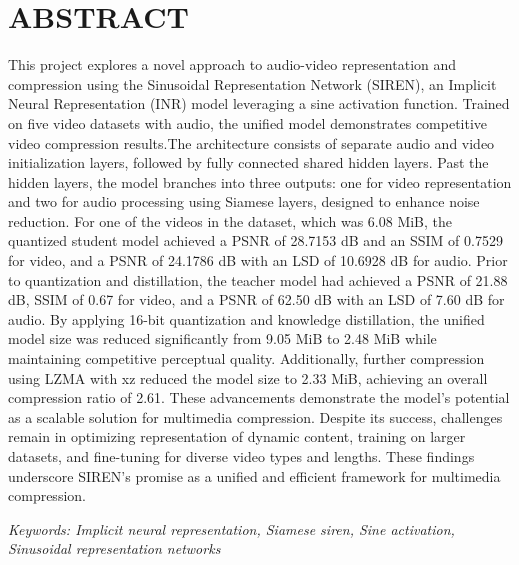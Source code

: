 \documentclass{ioereport}
\begin{document}
\section*{ABSTRACT}
    This project explores a novel approach to audio-video representation and compression using the Sinusoidal Representation Network (SIREN), an Implicit Neural Representation (INR) model leveraging a sine activation function. Trained on five video datasets with audio, the unified model demonstrates competitive video compression results.The architecture consists of separate audio and video initialization layers, followed by fully connected shared hidden layers. Past the hidden layers, the model branches into three outputs: one for video representation and two for audio processing using Siamese layers, designed to enhance noise reduction. For one of the videos in the dataset, which was 6.08 MiB, the quantized student model achieved a PSNR of 28.7153 dB and an SSIM of 0.7529 for video, and a PSNR of 24.1786 dB with an LSD of 10.6928 dB for audio. Prior to quantization and distillation, the teacher model had achieved a PSNR of 21.88 dB, SSIM of 0.67 for video, and a PSNR of 62.50 dB with an LSD of 7.60 dB for audio. By applying 16-bit quantization and knowledge distillation, the unified model size was reduced significantly from 9.05 MiB to 2.48 MiB while maintaining competitive perceptual quality. Additionally, further compression using LZMA with xz reduced the model size to 2.33 MiB, achieving an overall compression ratio of 2.61. These advancements demonstrate the model's potential as a scalable solution for multimedia compression. Despite its success, challenges remain in optimizing representation of dynamic content, training on larger datasets, and fine-tuning for diverse video types and lengths. These findings underscore SIREN's promise as a unified and efficient framework for multimedia compression.

    \textit{Keywords: Implicit neural representation, Siamese siren, Sine activation, Sinusoidal representation networks}

    \pagebreak
    
    \tableofcontents
    \pagebreak
    
    \listoffigures
    \pagebreak
    
    \listoftables
    \pagebreak

    \doublespacing
    \printglossary[type=\acronymtype,style=acronyms-only,title=List of Abbreviations{\vspace{0.15\baselineskip}}]
    \onehalfspacing
\end{document}
